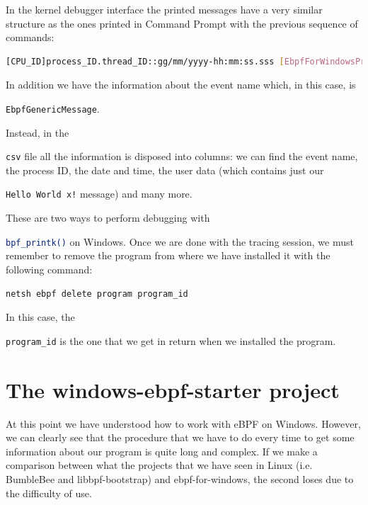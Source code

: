 In the kernel debugger interface the printed messages have a very similar structure as the ones printed in Command Prompt with the previous sequence of commands:

\begin{lstlisting}[style=commandline, language=bash, caption={Kernel debugging output messages format using \colorbox{backcolour}{\lstinline[style=commandline, language=bash]|tracelog|}.}]
	[CPU_ID]process_ID.thread_ID::gg/mm/yyyy-hh:mm:ss.sss [EbpfForWindowsProvider/EbpfGenericMessage]{"Message":"Hello World x!"}
\end{lstlisting}

In addition we have the information about the event name which, in this case, is \raggedright\colorbox{backcolour}{\lstinline[style=commandline, language=bash]|EbpfGenericMessage|}.

Instead, in the \raggedright\colorbox{backcolour}{\lstinline[style=commandline, language=bash]|csv|} file all the information is disposed into columns: we can find the event name, the process ID, the date and time, the user data (which contains just our \raggedright\colorbox{backcolour}{\lstinline[style=commandline, language=bash]|Hello World x!|} message) and many more. 

These are two ways to perform debugging with \raggedright\colorbox{backcolour}{\lstinline[style=commandline, language=bash]|bpf_printk()|} on Windows.
Once we are done with the tracing session, we must remember to remove the program from where we have installed it with the following command:

\begin{lstlisting}[style=commandline, language=bash, caption={``Hello world!''-like program delete command in ebpf-for-windows.}]
	netsh ebpf delete program program_id
\end{lstlisting}

In this case, the \raggedright\colorbox{backcolour}{\lstinline[style=commandline, language=bash]|program_id|} is the one that we get in return when we installed the program.

\section{The windows-ebpf-starter project}

At this point we have understood how to work with eBPF on Windows.
However, we can clearly see that the procedure that we have to do every time to get some information about our program is quite long and complex.
If we make a comparison between what the projects that we have seen in Linux (i.e. BumbleBee and libbpf-bootstrap) and ebpf-for-windows, the second loses due to the difficulty of use.

